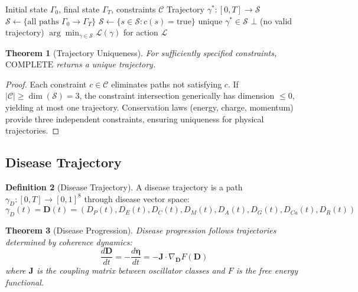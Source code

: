 \documentclass[10pt,twocolumn]{article}
\theoremstyle{plain}
\newtheorem{theorem}{Theorem}[section]
\theoremstyle{definition}
\newtheorem{definition}[theorem]{Definition}
\theoremstyle{remark}
\newcommand{\Sspace}{\mathcal{S}}
\newcommand{\Gstate}{\Gamma}
\newcommand{\Dvec}{\mathbf{D}}
\begin{document}
\begin{algorithm}[h]
\caption{COMPLETE: Constraint Satisfaction Trajectory Resolution}
\label{alg:complete}
\begin{algorithmic}[1]
\REQUIRE Initial state $\Gstate_0$, final state $\Gstate_T$, constraints $\mathcal{C}$
\ENSURE Trajectory $\gamma^*: [0,T] \to \Sspace$
\STATE $\mathcal{S} \leftarrow \{\text{all paths } \Gstate_0 \to \Gstate_T\}$
    \STATE $\mathcal{S} \leftarrow \{s \in \mathcal{S} : c(s) = \mathrm{true}\}$
\ENDFOR
{}
    \RETURN unique $\gamma^* \in \mathcal{S}$
    \RETURN $\bot$ (no valid trajectory)
\ELSE
    \RETURN $\arg\min_{\gamma \in \mathcal{S}} \mathcal{L}(\gamma)$ for action $\mathcal{L}$
\ENDIF
\end{algorithmic}
\end{algorithm}

\begin{theorem}[Trajectory Uniqueness]
\label{thm:uniqueness}
For sufficiently specified constraints, $\mathrm{COMPLETE}$ returns a unique trajectory.
\end{theorem}

\begin{proof}
Each constraint $c \in \mathcal{C}$ eliminates paths not satisfying $c$. If $|\mathcal{C}| \geq \dim(\Sspace) = 3$, the constraint intersection generically has dimension $\leq 0$, yielding at most one trajectory. Conservation laws (energy, charge, momentum) provide three independent constraints, ensuring uniqueness for physical trajectories.
\end{proof}

\subsection{Disease Trajectory}

\begin{definition}[Disease Trajectory]
\label{def:disease_trajectory}
A disease trajectory is a path $\gamma_D: [0, T] \to [0,1]^8$ through disease vector space:
\begin{equation}
\gamma_D(t) = \Dvec(t) = (D_P(t), D_E(t), D_C(t), D_M(t), D_A(t), D_G(t), D_{Ca}(t), D_R(t))
\end{equation}
\end{definition}

\begin{theorem}[Disease Progression]
\label{thm:progression}
Disease progression follows trajectories determined by coherence dynamics:
\begin{equation}
\frac{d\Dvec}{dt} = -\frac{d\boldsymbol{\eta}}{dt} = -\mathbf{J} \cdot \nabla_{\Dvec} F(\Dvec)
\label{eq:progression}
\end{equation}
where $\mathbf{J}$ is the coupling matrix between oscillator classes and $F$ is the free energy functional.
\end{theorem}
\end{document}
